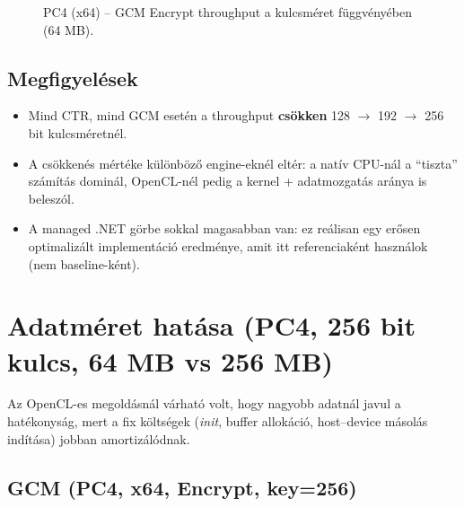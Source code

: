 \begin{figure}[h!]
  \centering
  \caption{PC4 (x64) -- GCM Encrypt throughput a kulcsméret függvényében (64 MB).}
\end{figure}

\subsection{Megfigyelések}

\begin{itemize}
  \item Mind CTR, mind GCM esetén a throughput \textbf{csökken} 128 $\rightarrow$ 192 $\rightarrow$ 256 bit kulcsméretnél.
  \item A csökkenés mértéke különböző engine-eknél eltér: a natív CPU-nál a ``tiszta'' számítás dominál,
        OpenCL-nél pedig a kernel + adatmozgatás aránya is beleszól.
  \item A managed .NET görbe sokkal magasabban van: ez reálisan egy erősen optimalizált implementáció eredménye,
        amit itt referenciaként használok (nem baseline-ként).
\end{itemize}

\section{Adatméret hatása (PC4, 256 bit kulcs, 64 MB vs 256 MB)}

Az OpenCL-es megoldásnál várható volt, hogy nagyobb adatnál javul a hatékonyság, mert
a fix költségek (\emph{init}, buffer allokáció, host--device másolás indítása) jobban amortizálódnak.

\subsection{GCM (PC4, x64, Encrypt, key=256)}

